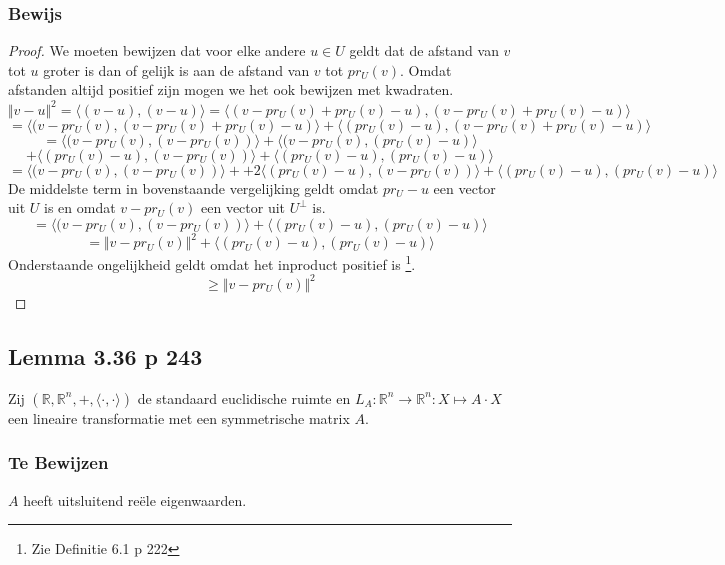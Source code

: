 \documentclass[lineaire_algebra_oplossingen.tex]{subfiles}
\begin{document}
\subsubsection*{Bewijs}
\begin{proof}
We moeten bewijzen dat voor elke andere $u\in U$ geldt dat de afstand van $v$ tot $u$ groter is dan of gelijk is aan de afstand van $v$ tot $pr_U(v)$. Omdat afstanden altijd positief zijn mogen we het ook bewijzen met kwadraten.
\[
\Vert v- u \Vert^2 = \langle (v-u) , (v-u)\rangle = \langle (v-pr_U(v)+pr_U(v)-u) , (v-pr_U(v)+pr_U(v)-u)\rangle
\]
\[
= \langle (v-pr_U(v), (v-pr_U(v)+pr_U(v)-u)\rangle + \langle (pr_U(v)-u) , (v-pr_U(v)+pr_U(v)-u)\rangle
\]
\[
= \langle (v-pr_U(v), (v-pr_U(v))\rangle + \langle (v-pr_U(v), (pr_U(v)-u)\rangle\]\[ +\langle (pr_U(v)-u) , (v-pr_U(v))\rangle + \langle (pr_U(v)-u) , (pr_U(v)-u)\rangle
\]
\[
= \langle (v-pr_U(v), (v-pr_U(v))\rangle + +2\langle (pr_U(v)-u) , (v-pr_U(v))\rangle + \langle (pr_U(v)-u) , (pr_U(v)-u)\rangle
\]
De middelste term in bovenstaande vergelijking geldt omdat $pr_U-u$ een vector uit $U$ is en omdat $v-pr_U(v)$ een vector uit $U^\bot$ is.
\[
 = \langle (v-pr_U(v), (v-pr_U(v))\rangle + \langle (pr_U(v)-u) , (pr_U(v)-u)\rangle
\]
\[
= \Vert v-pr_U(v) \Vert^2 + \langle (pr_U(v)-u) , (pr_U(v)-u)\rangle
\]
Onderstaande ongelijkheid geldt omdat het inproduct positief is \footnote{Zie Definitie 6.1 p 222}.
\[
\ge \Vert v-pr_U(v) \Vert^2
\]
\end{proof}

\subsection{Lemma 3.36 p 243}
Zij $(\mathbb{R},\mathbb{R}^n,+,\langle \cdot , \cdot \rangle)$ de standaard euclidische ruimte en $L_A : \mathbb{R}^n \rightarrow \mathbb{R}^n: X \mapsto A \cdot X$ een lineaire transformatie met een symmetrische matrix $A$.
\subsubsection*{Te Bewijzen}
$A$ heeft uitsluitend re\"ele eigenwaarden.
\end{document}
